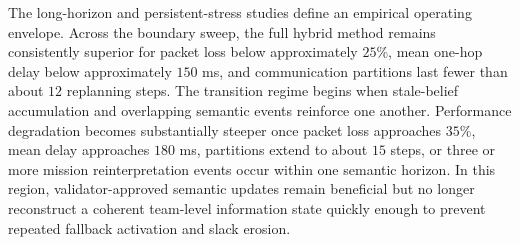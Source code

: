 The long-horizon and persistent-stress studies define an empirical operating envelope. Across the boundary sweep, the full hybrid method remains consistently superior for packet loss below approximately $25\%$, mean one-hop delay below approximately $150$ ms, and communication partitions last fewer than about $12$ replanning steps. The transition regime begins when stale-belief accumulation and overlapping semantic events reinforce one another. Performance degradation becomes substantially steeper once packet loss approaches $35\%$, mean delay approaches $180$ ms, partitions extend to about $15$ steps, or three or more mission reinterpretation events occur within one semantic horizon. In this region, validator-approved semantic updates remain beneficial but no longer reconstruct a coherent team-level information state quickly enough to prevent repeated fallback activation and slack erosion.